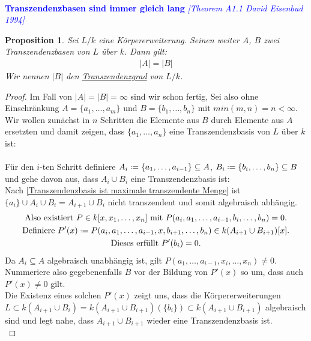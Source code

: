 \documentclass[10pt,a4paper]{report}
\newcommand{\comment}[1]{}
\newcommand{\ModulsOfDifferenzials}{David Eisenbud 1994}
\newcounter{Aussage}[chapter]
\newtheorem{prop}[Aussage]{Proposition}
\newcommand*{\defeq}{\mathrel{\vcenter{\baselineskip0.5ex \lineskiplimit0pt
                     \hbox{\scriptsize.}\hbox{\scriptsize.}}}%
                     =}
\begin{document}
\ \\
\textcolor{blue}{\textbf{Transzendenzbasen sind immer gleich lang} \textit{[Theorem A1.1 \ModulsOfDifferenzials]}}
\begin{prop}\comment{\label{Transzendenzbasen sind immer gleich lang}}
Sei $L / k$ eine Körpererweiterung. Seinen weiter $A$, $B$ zwei Transzendenzbasen von $L$ über $k$. Dann gilt:
\begin{gather*}
\vert A \vert = \vert B \vert
\end{gather*}
Wir nennen $\vert B \vert$ den \underline{Transzendenzgrad} von $L/k$.
\end{prop}
\begin{proof}
Im Fall von $\vert A \vert = \vert B \vert = \infty$ sind wir schon fertig, Sei also ohne Einschränkung $A = \lbrace a_1, \dots , a_m \rbrace$ und $B = \lbrace b_1, \dots , b_n \rbrace$ mit $min(m,n) = n < \infty$.\\
Wir wollen zunächst in $n$ Schritten die Elemente aus $B$ durch Elemente aus $A$ ersetzten und damit zeigen, dass $\lbrace a_1, \dots , a_n \rbrace$ eine Transzendenzbasis von $L$ über $k$ ist:\\
\ \\
Für den $i$-ten Schritt definiere $A_i \defeq \lbrace a_1,\dots,a_{i-1} \rbrace \subseteq A$, $B_i \defeq \lbrace b_i,\dots,b_n \rbrace \subseteq B$ und gehe davon aus, dass $A_i \cup B_i$ eine Transzendenzbasis ist:\\
Nach \cref{Transzendenzbasis ist maximale transzendente Menge} ist $\lbrace a_i \rbrace \cup A_{i} \cup B_{i} = A_{i+1} \cup B_{i}$ nicht transzendent und somit algebraisch abhängig.
\begin{gather*}
\text{Also existiert } P \in k[x,x_1,\dots,x_n] \text{ mit } P(a_i,a_1,\dots,a_{i-1},b_i,\dots,b_n) = 0. \\
\text{Definiere } P'(x) \defeq P(a_i,a_1,\dots,a_{i-1},x,b_{i+1},\dots,b_n) \in k(A_{i+1} \cup B_{i+1})[x].\\
\text{Dieses erfüllt } P'(b_i) = 0.
\end{gather*}
Da $A_i \subseteq A$ algebraisch unabhängig ist, gilt $P(a_1,\dots,a_{i-1},x_i,\dots,x_n) \neq 0$. Nummeriere also gegebenenfalls $B$ vor der Bildung von $P'(x)$ so um, dass auch $P'(x) \neq 0$ gilt.\\
Die Existenz eines solchen $P'(x)$ zeigt uns, dass die Körpererweiterungen \\$L \subset k(A_{i+1} \cup B_i) = k(A_{i+1} \cup B_{i+1})(\lbrace b_i \rbrace) \subset k(A_{i+1} \cup B_{i+1})$ algebraisch sind und legt nahe, dass $A_{i+1} \cup B_{i+1}$ wieder eine Transzendenzbasis ist.\\

\end{proof}
\end{document}
